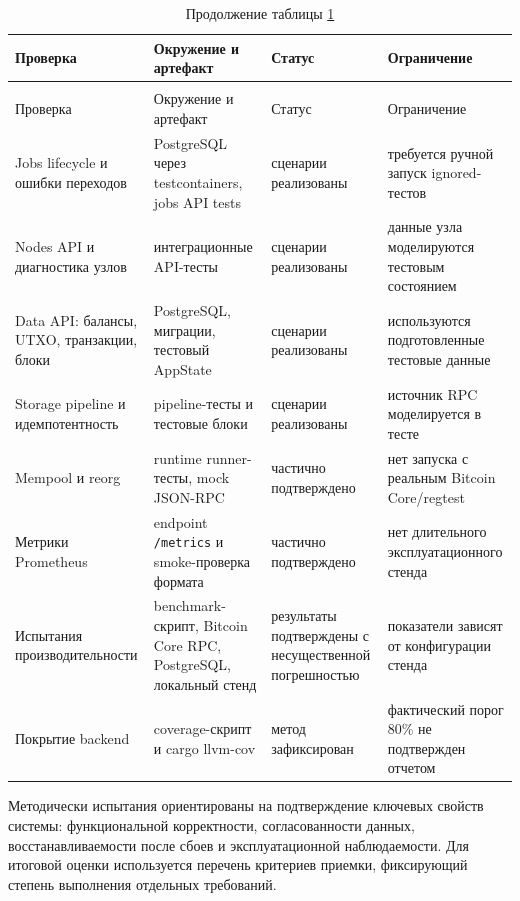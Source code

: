 \begin{footnotesize}
\setlength{\tabcolsep}{3pt}
\begin{longtable}{|p{}|p{}|p{}|p{}|}
    \caption{Протокол проверки качества системы}\label{tab:test-protocol}\\ \hline
    Проверка & Окружение и артефакт & Статус & Ограничение \\ \hline
    \endfirsthead
    \caption*{Продолжение таблицы \ref{tab:test-protocol}}\\ \hline
    Проверка & Окружение и артефакт & Статус & Ограничение \\ \hline
    \endhead
    \hline
    \endfoot
    \hline
    \endlastfoot
    Jobs lifecycle и ошибки переходов &
    PostgreSQL через testcontainers, jobs API tests &
    сценарии реализованы &
    требуется ручной запуск ignored-тестов \\ \hline
    Nodes API и диагностика узлов &
    интеграционные API-тесты &
    сценарии реализованы &
    данные узла моделируются тестовым состоянием \\ \hline
    Data API: балансы, UTXO, транзакции, блоки &
    PostgreSQL, миграции, тестовый AppState &
    сценарии реализованы &
    используются подготовленные тестовые данные \\ \hline
    Storage pipeline и идемпотентность &
    pipeline-тесты и тестовые блоки &
    сценарии реализованы &
    источник RPC моделируется в тесте \\ \hline
    Mempool и reorg &
    runtime runner-тесты, mock JSON-RPC &
    частично подтверждено &
    нет запуска с реальным Bitcoin Core/regtest \\ \hline
    Метрики Prometheus &
    endpoint \texttt{/metrics} и smoke-проверка формата &
    частично подтверждено &
    нет длительного эксплуатационного стенда \\ \hline
    Испытания производительности &
    benchmark-скрипт, Bitcoin Core RPC, PostgreSQL, локальный стенд &
    результаты подтверждены с несущественной погрешностью &
    показатели зависят от конфигурации стенда \\ \hline
    Покрытие backend &
    coverage-скрипт и cargo llvm-cov &
    метод зафиксирован &
    фактический порог 80\% не подтвержден отчетом \\ \hline
\end{longtable}
\end{footnotesize}

Методически испытания ориентированы на подтверждение ключевых свойств системы:
функциональной корректности, согласованности данных, восстанавливаемости после
сбоев и эксплуатационной наблюдаемости. Для итоговой оценки используется
перечень критериев приемки, фиксирующий степень выполнения отдельных
требований.

